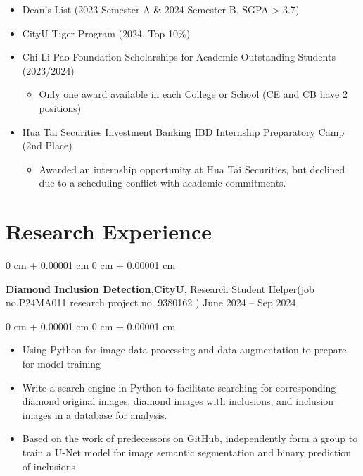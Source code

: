 \documentclass[10pt, letterpaper]{article}
\newenvironment{highlights}{
    \begin{itemize}[
        topsep=0.10 cm,
        parsep=0.10 cm,
        partopsep=0pt,
        itemsep=0pt,
        leftmargin=0 cm + 10pt
    ]
}{
    \end{itemize}
} %
\newenvironment{onecolentry}{
    \begin{adjustwidth}{
        0 cm + 0.00001 cm
    }{
        0 cm + 0.00001 cm
    }
}{
    \end{adjustwidth}
} %
\newenvironment{twocolentry}[2][]{
    \onecolentry
    \def\secondColumn{#2}
    \setcolumnwidth{\fill, 4.5 cm}
    \begin{paracol}{2}
}{
    \switchcolumn \raggedleft \secondColumn
    \end{paracol}
    \endonecolentry
} %
\begin{document}
\begin{itemize}
    \item Dean's List (2023 Semester A \& 2024 Semester B, SGPA > 3.7)
    \item CityU Tiger Program (2024, Top 10\%)
    \item Chi-Li Pao Foundation Scholarships for Academic Outstanding Students (2023/2024) 
    \begin{itemize}
        \item Only one award available in each College or School (CE and CB have 2 positions)
    \end{itemize}
    \item Hua Tai Securities Investment Banking IBD Internship Preparatory Camp (2nd Place) 
    \begin{itemize}
        \item Awarded an internship opportunity at Hua Tai Securities, but declined due to a scheduling conflict with academic commitments.
    \end{itemize}
\end{itemize}

    \section{Research Experience}



        
        \begin{twocolentry}{
            June 2024 – Sep 2024
            
        }
            \textbf{Diamond Inclusion Detection,CityU}, Research Student Helper(job no.P24MA011 research project no. 9380162 )\end{twocolentry}

        \vspace{0.10 cm}
        \begin{onecolentry}
            \begin{highlights}
                \item Using Python for image data processing and data augmentation to prepare for model training 
                \item Write a search engine in Python to facilitate searching for corresponding diamond original images, diamond images with inclusions, and inclusion images in a database for analysis. 
                \item Based on the work of predecessors on GitHub, independently form a group to train a U-Net model for image semantic segmentation and binary prediction of inclusions 
            \end{highlights}
        \end{onecolentry}
\end{document}
